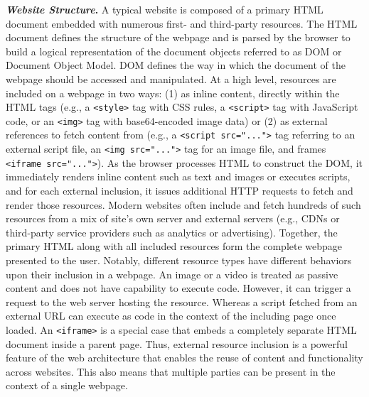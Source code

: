 \noindent \textbf{\textit{Website Structure}.} 
%
A typical website is composed of a primary HTML document embedded with numerous first- and third-party resources. 
%
The HTML document defines the structure of the webpage and is parsed by the browser to build a logical representation of the document objects referred to as DOM or Document Object Model. 
%
DOM defines the way in which the document of the webpage should be accessed and manipulated. 
%
At a high level, resources are included on a webpage in two ways: (1) as inline content, directly within the HTML tags (e.g., a \texttt{<style>} tag with CSS rules, a \texttt{<script>} tag with JavaScript code, or an \texttt{<img>} tag with base64-encoded image data) or (2) as external references to fetch content from (e.g., a \texttt{<script src="...">} tag referring to an external script file, an \texttt{<img src="...">} tag for an image file, and frames \texttt{<iframe src="...">}). 
%
As the browser processes HTML to construct the DOM, it immediately renders inline content such as text and images or executes scripts, and for each external inclusion, it issues additional HTTP requests to fetch and render those resources. 
%
Modern websites often include and fetch hundreds of such resources from a mix of site’s own server and external servers (e.g., CDNs or third-party service providers such as analytics or advertising). 
%
Together, the primary HTML along with all included resources form the complete webpage presented to the user.
%
Notably, different resource types have different behaviors upon their inclusion in a webpage.
%
An image or a video is treated as passive content and does not have capability to execute code. 
%
However, it can trigger a request to the web server hosting the resource.
%
Whereas a script fetched from an external URL can execute as code in the context of the including page once loaded.
%
An \texttt{<iframe>} is a special case that embeds a completely separate HTML document inside a parent page. %
%
Thus, external resource inclusion is a powerful feature of the web architecture that enables the reuse of content and functionality across websites. 
%
This also means that multiple parties can be present in the context of a single webpage.


